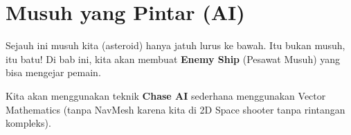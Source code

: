 
\section{Musuh yang Pintar (AI)}

Sejauh ini musuh kita (asteroid) hanya jatuh lurus ke bawah. Itu bukan musuh, itu batu!
Di bab ini, kita akan membuat \textbf{Enemy Ship} (Pesawat Musuh) yang bisa mengejar pemain.

Kita akan menggunakan teknik \textbf{Chase AI} sederhana menggunakan Vector Mathematics (tanpa NavMesh karena kita di 2D Space shooter tanpa rintangan kompleks).

